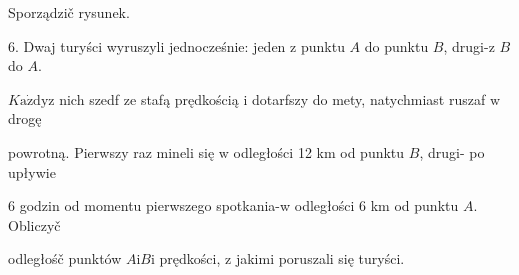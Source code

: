 \documentclass[a4paper,12pt]{article}
\begin{document}
Sporządzič rysunek.

6. Dwaj turyści wyruszyli jednocześnie: jeden $\mathrm{z}$ punktu $A$ do punktu $B$, drugi-z $B$ do $A.$

$K\mathrm{a}\dot{\mathrm{z}}\mathrm{d}\mathrm{y}\mathrm{z}$ nich szedf ze stafą prędkością $\mathrm{i}$ dotarfszy do mety, natychmiast ruszaf $\mathrm{w}$ drogę

powrotną. Pierwszy raz mineli się $\mathrm{w}$ odległości 12 km od punktu $B$, drugi- po upływie

6 godzin od momentu pierwszego spotkania-w odległości 6 km od punktu $A$. Obliczyč

odległośč punktów $A\mathrm{i}B\mathrm{i}$ prędkości, $\mathrm{z}$ jakimi poruszali się turyści.
\end{document}
